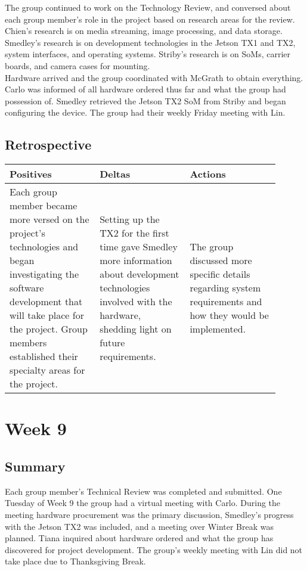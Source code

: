 \documentclass[letterpaper,10pt,serif,draftclsnofoot,onecolumn,compsoc,titlepage]{IEEEtran}
\begin{document}
The group continued to work on the Technology Review, and conversed about each group 
member's role in the project based on research areas for the review. Chien's research 
is on media streaming, image processing, and data storage. Smedley's research is on 
development technologies in the Jetson TX1 and TX2, system interfaces, and operating 
systems. Striby's research is on SoMs, carrier boards, and camera cases for mounting. \\

Hardware arrived and the group coordinated with McGrath to obtain everything. Carlo was 
informed of all hardware ordered thus far and what the group had possession of. Smedley 
retrieved the Jetson TX2 SoM from Striby and began configuring the device. The group 
had their weekly Friday meeting with Lin.\\

\subsection{Retrospective}

\begin{tabular}{|p{0.3\linewidth}|p{0.3\linewidth}|p{0.3\linewidth}|}
   \hline
   \textbf{Positives} & \textbf{Deltas} & \textbf{Actions}\\ 
   \hline
   Each group member became more versed on the project's technologies and 
   began investigating the software development that will take place for the project. 
   Group members established their specialty areas for the project.  
   & 
   Setting up the TX2 for the first time gave Smedley more information about development technologies involved with the hardware, shedding light on future requirements. 
   & 
   The group discussed more specific details regarding system requirements and how they would be implemented. 
   \\
   \hline
\end{tabular}

\section{Week 9}

\subsection{Summary}

Each group member's Technical Review was completed and submitted. One Tuesday of Week 
9 the group had a virtual meeting with Carlo. During the meeting hardware procurement 
was the primary discussion, Smedley's progress with the Jetson TX2 was included, and 
a meeting over Winter Break was planned. Tiana inquired about hardware ordered and 
what the group has discovered for project development. The group's weekly meeting with 
Lin did not take place due to Thanksgiving Break. \\
\end{document}
